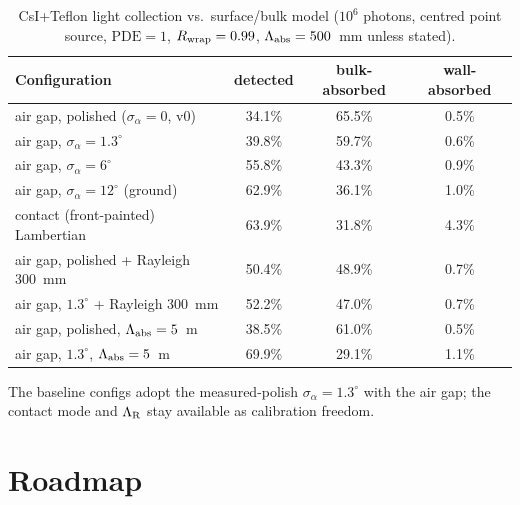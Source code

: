 \documentclass[11pt,a4paper]{article}
\newcommand{\csi}{CsI}
\begin{document}
\begin{table}[htb]
  \centering
  \caption{\csi{}+Teflon light collection vs.\ surface/bulk model
  ($10^6$ photons, centred point source, $\mathrm{PDE}=1$, $R_{\rm wrap}=0.99$,
  $\Lambda_{\rm abs}=500$~mm unless stated).}
  \label{tab:surfscan}
  \begin{tabular}{lccc}
    \toprule
    Configuration & detected & bulk-absorbed & wall-absorbed \\
    \midrule
    air gap, polished ($\sigma_\alpha=0$, v0)        & 34.1\% & 65.5\% & 0.5\% \\
    air gap, $\sigma_\alpha = 1.3^\circ$             & 39.8\% & 59.7\% & 0.6\% \\
    air gap, $\sigma_\alpha = 6^\circ$               & 55.8\% & 43.3\% & 0.9\% \\
    air gap, $\sigma_\alpha = 12^\circ$ (ground)     & 62.9\% & 36.1\% & 1.0\% \\
    contact (front-painted) Lambertian               & 63.9\% & 31.8\% & 4.3\% \\
    air gap, polished + Rayleigh 300~mm              & 50.4\% & 48.9\% & 0.7\% \\
    air gap, $1.3^\circ$ + Rayleigh 300~mm           & 52.2\% & 47.0\% & 0.7\% \\
    air gap, polished, $\Lambda_{\rm abs}=5$~m       & 38.5\% & 61.0\% & 0.5\% \\
    air gap, $1.3^\circ$, $\Lambda_{\rm abs}=5$~m    & 69.9\% & 29.1\% & 1.1\% \\
    \bottomrule
  \end{tabular}
\end{table}

The baseline configs adopt the measured-polish $\sigma_\alpha = 1.3^\circ$ with the air
gap; the contact mode and $\Lambda_{\rm R}$ stay available as calibration freedom.

\section{Roadmap}
\label{sec:roadmap}
\end{document}
